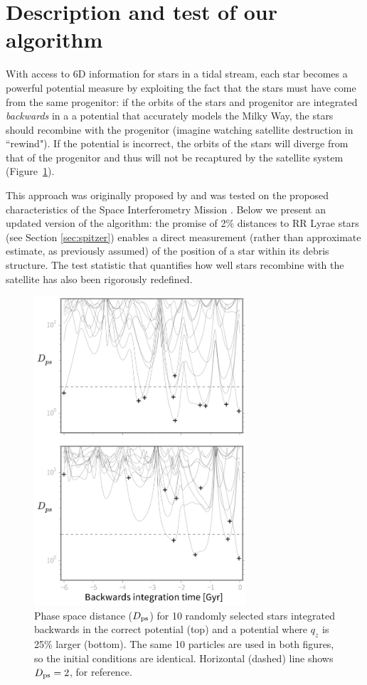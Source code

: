 \section{Description and test of our algorithm}
\label{sec:method}
With access to 6D information for stars in a tidal
stream, each star becomes a powerful potential
measure by exploiting the fact that the stars must have come from the
same progenitor: if the orbits of the stars and progenitor are integrated 
\emph{backwards} in a a potential that accurately models the Milky Way, the stars
should recombine with the progenitor (imagine watching satellite destruction in ``rewind"). If the potential is incorrect,
the orbits of the stars will diverge from that of the progenitor and
thus will not be recaptured by the satellite system (Figure~\ref{fig:ps_distance}).

This approach was originally proposed by \citet{johnston99a} and was tested on the proposed characteristics of the Space
Interferometry Mission \citep{unwin08}. Below we present an updated version of the algorithm:
the promise of 2\% distances to RR Lyrae stars (see Section
\ref{sec:spitzer}) enables a direct measurement (rather than
approximate estimate, as previously assumed) of the position of a star within its debris
structure. The test statistic that quantifies how well stars recombine
with the satellite has also been rigorously redefined.

\begin{figure}[h]
\begin{center}
\includegraphics[width=0.7\textwidth,trim=5 0 0 0, clip]{figures/ch1/fig3.pdf}
\caption{Phase space distance ($D_{\rm ps}$) for 10 randomly selected stars integrated backwards in the correct potential (top) and a potential where $q_z$ is 25\% larger (bottom). The same 10 particles are used in both figures, so the initial conditions are identical. Horizontal (dashed) line shows $D_{\rm ps}=2$, for reference.}\label{fig:ps_distance}
\end{center}
\end{figure}

